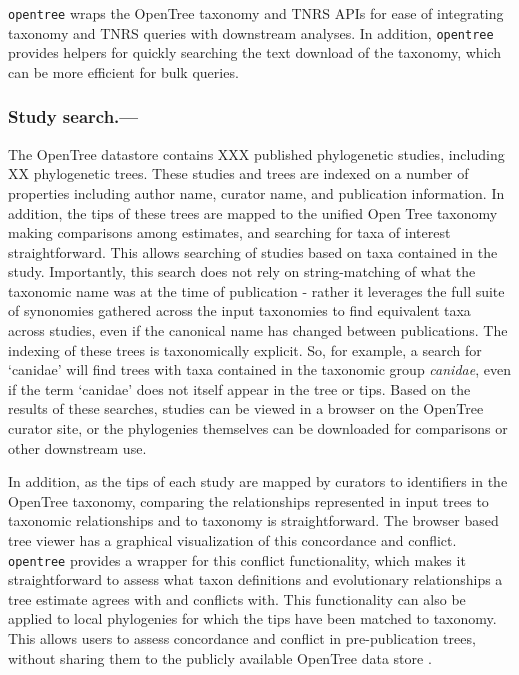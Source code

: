 \documentclass[oupdraft]{sysbio_sse}
\begin{document}
\texttt{opentree} wraps the OpenTree taxonomy and TNRS APIs for ease of integrating taxonomy and TNRS queries with downstream analyses. In addition, \texttt{opentree} provides helpers for quickly searching the text download of the taxonomy, which can be more efficient for bulk queries.


\subsubsection{Study search.---} The OpenTree datastore contains XXX published phylogenetic studies, including XX phylogenetic trees.
These studies and trees are indexed on a number of properties including author name, curator name, and publication information. 
In addition, the tips of these trees are mapped to the unified Open Tree taxonomy making comparisons among estimates, and searching for taxa of interest straightforward.
This allows searching of studies based on taxa contained in the study.
Importantly, this search does not rely on string-matching of what the taxonomic name was at the time of publication - rather it leverages the full suite of synonomies gathered across the input taxonomies to find equivalent taxa across studies, even if the canonical name has changed between publications.
The indexing of these trees is taxonomically explicit.
So, for example, a search for `canidae' will find trees with taxa contained in the taxonomic group \textit{canidae}, even if the term `canidae' does not itself appear in the tree or tips.
Based on the results of these searches, studies can be viewed in a browser on the OpenTree curator site, or the phylogenies themselves can be downloaded for comparisons or other downstream use.

In addition, as the tips of each study are mapped by curators to identifiers in the OpenTree taxonomy, comparing the relationships represented in input trees to taxonomic relationships and to taxonomy is straightforward. The browser based tree viewer has a graphical visualization of this concordance and conflict. \texttt{opentree} provides a wrapper for this conflict functionality, which makes it straightforward to assess what taxon definitions and evolutionary relationships a tree estimate agrees with and conflicts with. This functionality can also be applied to local phylogenies for which the tips have been matched to taxonomy. This allows users to assess concordance and conflict in pre-publication trees, without sharing them to the publicly available OpenTree data store \citep{mctavish_phylesystem_2015}.
\end{document}
